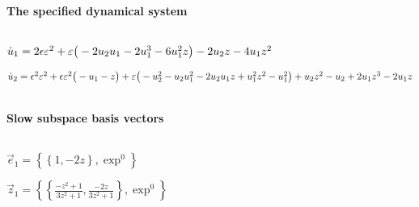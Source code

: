 
\(\)
\paragraph{The specified dynamical system}
\(
\)\par

\(\dot u_{1}=2 \epsilon  \eps^{2}+\eps \lPar -2 u_{2} u_{1}-2 u_{1}^{3}-6 
u_{1}^{2} z\rPar-2 u_{2} z-4 u_{1} z^{2}
\)\par

\(\dot u_{2}=\epsilon ^{2} \eps^{2}+\epsilon  \eps^{2} \lPar -u_{1}-z\rPar
+\eps \lPar -u_{2}^{2}-u_{2} u_{1}^{2}-2 u_{2} u_{1} z+u_{1}^{2} z^{2}-u
_{1}^{2}\rPar+u_{2} z^{2}-u_{2}+2 u_{1} z^{3}-2 u_{1} z
\)\par

\(\)
\paragraph{Slow
subspace basis vectors}
\(
\)\par

\(\vec e_{1}=\left\{
\left\{
1 , -2 z
\right\} , \exp ^{0}
\right\}
\)\par

\(\vec z_{1}=\left\{
\left\{
\frac{-z^{2}+1}{3 z^{2}+1} , \frac{-2 z}{3 z^{2}+1}
\right\} , \exp ^{
0}
\right\}
\)\par
